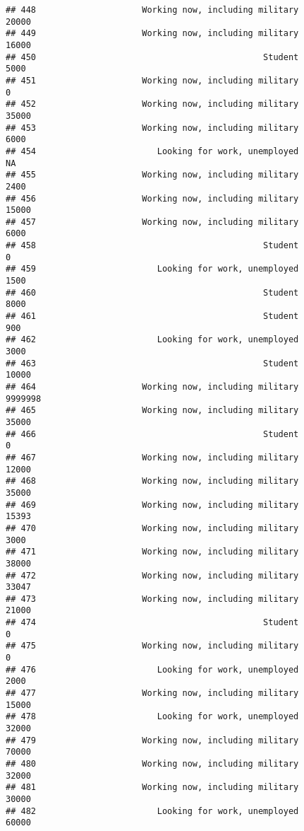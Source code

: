 \documentclass[]{book}
\theoremstyle{definition}
\theoremstyle{definition}
\theoremstyle{remark}
\begin{document}
\begin{verbatim}
## 448                     Working now, including military           20000
## 449                     Working now, including military           16000
## 450                                             Student            5000
## 451                     Working now, including military               0
## 452                     Working now, including military           35000
## 453                     Working now, including military            6000
## 454                        Looking for work, unemployed              NA
## 455                     Working now, including military            2400
## 456                     Working now, including military           15000
## 457                     Working now, including military            6000
## 458                                             Student               0
## 459                        Looking for work, unemployed            1500
## 460                                             Student            8000
## 461                                             Student             900
## 462                        Looking for work, unemployed            3000
## 463                                             Student           10000
## 464                     Working now, including military         9999998
## 465                     Working now, including military           35000
## 466                                             Student               0
## 467                     Working now, including military           12000
## 468                     Working now, including military           35000
## 469                     Working now, including military           15393
## 470                     Working now, including military            3000
## 471                     Working now, including military           38000
## 472                     Working now, including military           33047
## 473                     Working now, including military           21000
## 474                                             Student               0
## 475                     Working now, including military               0
## 476                        Looking for work, unemployed            2000
## 477                     Working now, including military           15000
## 478                        Looking for work, unemployed           32000
## 479                     Working now, including military           70000
## 480                     Working now, including military           32000
## 481                     Working now, including military           30000
## 482                        Looking for work, unemployed           60000

\end{verbatim}
\end{document}
